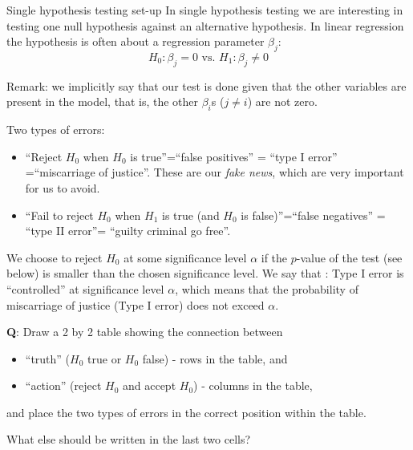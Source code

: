 \documentclass[
  ignorenonframetext,
]{beamer}
\providecommand{\tightlist}{%
  \setlength{\itemsep}{0pt}\setlength{\parskip}{0pt}}
\begin{document}
\begin{frame}
\begin{block}{Single hypothesis testing set-up}
\label{single-hypothesis-testing-set-up}
In single hypothesis testing we are interesting in testing one null
hypothesis against an alternative hypothesis. In linear regression the
hypothesis is often about a regression parameter \(\beta_j\):
\[H_0: \beta_j=0 \text{ vs. } H_1: \beta_j\neq 0\]

Remark: we implicitly say that our test is done given that the other
variables are present in the model, that is, the other \(\beta_i\)s
(\(j\neq i\)) are not zero.
\end{block}
\end{frame}

\begin{frame}
\begin{block}{Two types of errors:}
\label{two-types-of-errors}
\begin{itemize}
\item
  ``Reject \(H_0\) when \(H_0\) is true''=``false positives'' = ``type I
  error'' =``miscarriage of justice''. These are our \emph{fake news},
  which are very important for us to avoid.
\item
  ``Fail to reject \(H_0\) when \(H_1\) is true (and \(H_0\) is
  false)''=``false negatives'' = ``type II error''= ``guilty criminal go
  free''.
\end{itemize}
\end{block}
\end{frame}

\begin{frame}
We choose to reject \(H_0\) at some significance level \(\alpha\) if the
\(p\)-value of the test (see below) is smaller than the chosen
significance level. We say that : Type I error is ``controlled'' at
significance level \(\alpha\), which means that the probability of
miscarriage of justice (Type I error) does not exceed \(\alpha\).

\textbf{Q}: Draw a 2 by 2 table showing the connection between

\begin{itemize}
\tightlist
\item
  ``truth'' (\(H_0\) true or \(H_0\) false) - rows in the table, and
\item
  ``action'' (reject \(H_0\) and accept \(H_0\)) - columns in the table,
\end{itemize}

and place the two types of errors in the correct position within the
table.

What else should be written in the last two cells?
\end{frame}
\end{document}
